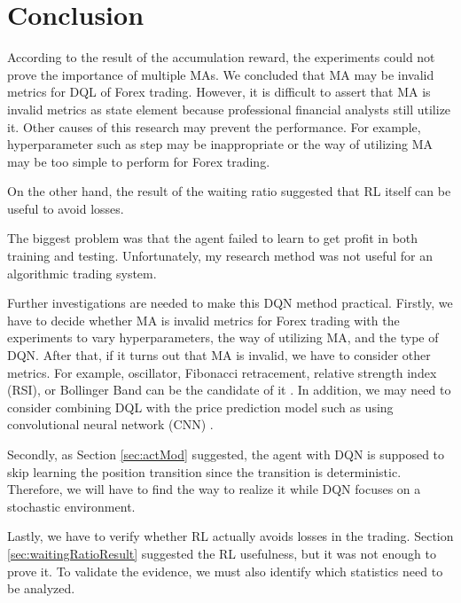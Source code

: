 \chapter{Conclusion}
\label{sec:conclusion}
According to the result of the accumulation reward, the experiments could not prove the importance of multiple MAs. We concluded that MA may be invalid metrics for DQL of Forex trading. However, it is difficult to assert that MA is invalid metrics as state element because professional financial analysts still utilize it. Other causes of this research may prevent the performance. For example, hyperparameter such as step may be inappropriate or the way of utilizing MA may be too simple to perform for Forex trading. 

On the other hand, the result of the waiting ratio suggested that RL itself can be useful to avoid losses.

The biggest problem was that the agent failed to learn to get profit in both training and testing. Unfortunately, my research method was not useful for an algorithmic trading system.

Further investigations are needed to make this DQN method practical. Firstly, we have to decide whether MA is invalid metrics for Forex trading with the experiments to vary hyperparameters, the way of utilizing MA, and the type of DQN. After that, if it turns out that MA is invalid, we have to consider other metrics. For example, oscillator, Fibonacci retracement, relative strength index (RSI), or Bollinger Band can be the candidate of it \cite{analysisMetrics}. In addition, we may need to consider combining DQL with the price prediction model such as using convolutional neural network (CNN) \cite{Suchaimanacharoen2020}.

Secondly, as Section \ref{sec:actMod} suggested, the agent with DQN is supposed to skip learning the position transition since the transition is deterministic. Therefore, we will have to find the way to realize it while DQN focuses on a stochastic environment.

Lastly, we have to verify whether RL actually avoids losses in the trading. Section \ref{sec:waitingRatioResult} suggested the RL usefulness, but it was not enough to prove it. To validate the evidence, we must also identify which statistics need to be analyzed.
